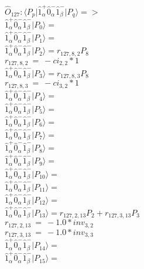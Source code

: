 \documentclass[14pt]{article}
\begin{document}
    $\hat{O}_{127}:  \langle{P_p}\vert \hat{1}_{\alpha}^{+}\hat{0}_{\alpha}^{-}\hat{1}_{\beta}^{-} \vert{P_q}\rangle => $ \\ 
    $ \hat{1}_{\alpha}^{+}\hat{0}_{\alpha}^{-}\hat{1}_{\beta}^{-} \vert{P_{0}}\rangle =  $ \\ 
    $ \hat{1}_{\alpha}^{+}\hat{0}_{\alpha}^{-}\hat{1}_{\beta}^{-} \vert{P_{1}}\rangle =  $ \\ 
    $ \hat{1}_{\alpha}^{+}\hat{0}_{\alpha}^{-}\hat{1}_{\beta}^{-} \vert{P_{2}}\rangle = {r}_{127,8,2}P_{8} $ \\ 
    ${r}_{127,8,2}\ =\ -{ci}_{2,2}*1 $ \\ 
    $ \hat{1}_{\alpha}^{+}\hat{0}_{\alpha}^{-}\hat{1}_{\beta}^{-} \vert{P_{3}}\rangle = {r}_{127,8,3}P_{8} $ \\ 
    ${r}_{127,8,3}\ =\ -{ci}_{3,2}*1 $ \\ 
    $ \hat{1}_{\alpha}^{+}\hat{0}_{\alpha}^{-}\hat{1}_{\beta}^{-} \vert{P_{4}}\rangle =  $ \\ 
    $ \hat{1}_{\alpha}^{+}\hat{0}_{\alpha}^{-}\hat{1}_{\beta}^{-} \vert{P_{5}}\rangle =  $ \\ 
    $ \hat{1}_{\alpha}^{+}\hat{0}_{\alpha}^{-}\hat{1}_{\beta}^{-} \vert{P_{6}}\rangle =  $ \\ 
    $ \hat{1}_{\alpha}^{+}\hat{0}_{\alpha}^{-}\hat{1}_{\beta}^{-} \vert{P_{7}}\rangle =  $ \\ 
    $ \hat{1}_{\alpha}^{+}\hat{0}_{\alpha}^{-}\hat{1}_{\beta}^{-} \vert{P_{8}}\rangle =  $ \\ 
    $ \hat{1}_{\alpha}^{+}\hat{0}_{\alpha}^{-}\hat{1}_{\beta}^{-} \vert{P_{9}}\rangle =  $ \\ 
    $ \hat{1}_{\alpha}^{+}\hat{0}_{\alpha}^{-}\hat{1}_{\beta}^{-} \vert{P_{10}}\rangle =  $ \\ 
    $ \hat{1}_{\alpha}^{+}\hat{0}_{\alpha}^{-}\hat{1}_{\beta}^{-} \vert{P_{11}}\rangle =  $ \\ 
    $ \hat{1}_{\alpha}^{+}\hat{0}_{\alpha}^{-}\hat{1}_{\beta}^{-} \vert{P_{12}}\rangle =  $ \\ 
    $ \hat{1}_{\alpha}^{+}\hat{0}_{\alpha}^{-}\hat{1}_{\beta}^{-} \vert{P_{13}}\rangle = {r}_{127,2,13}P_{2}+{r}_{127,3,13}P_{3} $ \\ 
    ${r}_{127,2,13}\ =\ -1.0*{inv}_{3,2} $ \\ 
    ${r}_{127,3,13}\ =\ -1.0*{inv}_{3,3} $ \\ 
    $ \hat{1}_{\alpha}^{+}\hat{0}_{\alpha}^{-}\hat{1}_{\beta}^{-} \vert{P_{14}}\rangle =  $ \\ 
    $ \hat{1}_{\alpha}^{+}\hat{0}_{\alpha}^{-}\hat{1}_{\beta}^{-} \vert{P_{15}}\rangle =  $ \\ 
    
\end{document}
